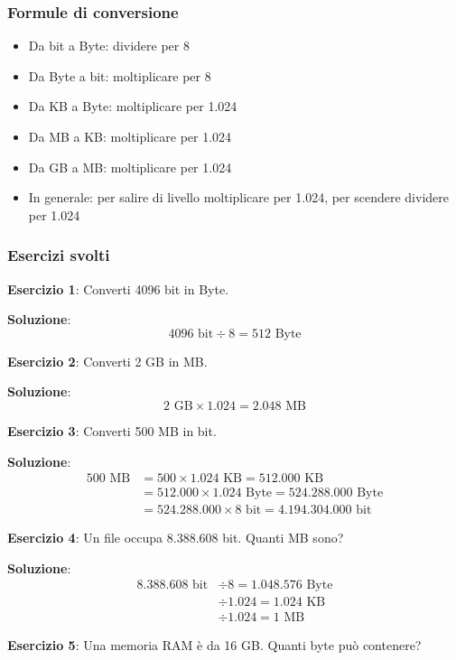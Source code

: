 \documentclass[12pt,a4paper]{article}
\begin{document}
\subsubsection{Formule di conversione}
\begin{itemize}
    \item Da bit a Byte: dividere per 8
    \item Da Byte a bit: moltiplicare per 8
    \item Da KB a Byte: moltiplicare per 1.024
    \item Da MB a KB: moltiplicare per 1.024
    \item Da GB a MB: moltiplicare per 1.024
    \item In generale: per salire di livello moltiplicare per 1.024, per scendere dividere per 1.024
\end{itemize}

\subsubsection{Esercizi svolti}

\textbf{Esercizio 1}: Converti 4096 bit in Byte.

\textbf{Soluzione}:
\[
4096 \text{ bit} \div 8 = 512 \text{ Byte}
\]

\textbf{Esercizio 2}: Converti 2 GB in MB.

\textbf{Soluzione}:
\[
2 \text{ GB} \times 1.024 = 2.048 \text{ MB}
\]

\textbf{Esercizio 3}: Converti 500 MB in bit.

\textbf{Soluzione}:
\begin{align*}
500 \text{ MB} &= 500 \times 1.024 \text{ KB} = 512.000 \text{ KB} \\
&= 512.000 \times 1.024 \text{ Byte} = 524.288.000 \text{ Byte} \\
&= 524.288.000 \times 8 \text{ bit} = 4.194.304.000 \text{ bit}
\end{align*}

\textbf{Esercizio 4}: Un file occupa 8.388.608 bit. Quanti MB sono?

\textbf{Soluzione}:
\begin{align*}
8.388.608 \text{ bit} &\div 8 = 1.048.576 \text{ Byte} \\
&\div 1.024 = 1.024 \text{ KB} \\
&\div 1.024 = 1 \text{ MB}
\end{align*}

\textbf{Esercizio 5}: Una memoria RAM è da 16 GB. Quanti byte può contenere?
\end{document}
